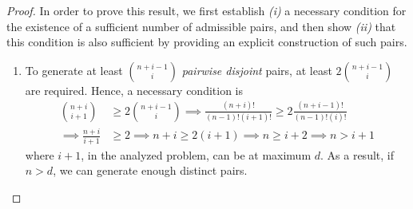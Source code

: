 \begin{proof}
In order to prove this result, we first establish \emph{(i)} a necessary condition for the existence of a sufficient number of admissible pairs, and then show \emph{(ii)} that this condition is also sufficient by providing an explicit construction of such pairs.


\begin{enumerate}[\itshape i)]
    \item To generate at least \(\binom{n+i-1}{i}\) \emph{pairwise disjoint} pairs, at least \(2\binom{n+i-1}{i}\) are required. 
    Hence, a necessary condition is
    \[
    \begin{split}
       \binom{n + i}{i+1} &\ge 2\binom{n+i-1}{i} \implies \frac{(n+i)!}{(n-1)!(i+1)!} \ge 2\frac{(n+i-1)!}{(n-1)!(i)!}\\
       \implies \frac{n+i}{i+1} &\ge 2 \implies n+i \ge 2(i+1) \implies  n \ge i+2 \implies n > i+1
    \end{split}
    \] where \(i+1\), in the analyzed problem, can be at maximum \(d\). As a result, if \(n > d\), we can generate enough distinct pairs. 



\end{enumerate}
\end{proof}

